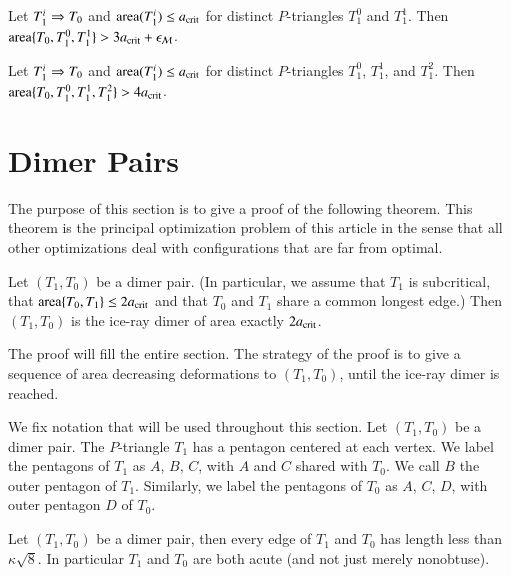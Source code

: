 \begin{lemma}
  Let $T_1^i\Rightarrow T_0$ and ${\operatorname{area}}(T_1^i)\le a_\text{crit}$  for
  distinct $P$-triangles $T_1^0$ and $T_1^1$.  Then
  ${\operatorname{area}}\{T_0,T_1^0,T_1^1\} > 3a_\text{crit} + \epsilon_{\mathcal M}$.
\end{lemma}

\begin{lemma}
  Let $T_1^i\Rightarrow T_0$ and ${\operatorname{area}}(T_1^i)\le a_\text{crit}$ for distinct
  $P$-triangles $T_1^0$, $T_1^1$, and $T_1^2$.  Then
  ${\operatorname{area}}\{T_0,T_1^0,T_1^1,T_1^2\} > 4a_\text{crit}$.
\end{lemma}


\section{Dimer Pairs}

The purpose of this section is to give a proof of the following
theorem.  This theorem is the principal optimization problem of this
article in the sense that all other optimizations deal with
configurations that are far from optimal.


\begin{theorem}
  Let $(T_1,T_0)$ be a dimer pair.  (In particular, we assume that
  $T_1$ is subcritical, that ${\operatorname{area}}\{T_0,T_1\}\le 2a_\text{crit}$ and that
  $T_0$ and $T_1$ share a common longest edge.)  Then $(T_1,T_0)$ is
  the ice-ray dimer of area exactly $2a_\text{crit}$.
\end{theorem}

The proof will fill the entire section.  The strategy of the proof is
to give a sequence of area decreasing deformations to $(T_1,T_0)$,
until the ice-ray dimer is reached.

We fix notation that will be used throughout this section. Let $(T_1,T_0)$ be
 a dimer pair.  The $P$-triangle $T_1$ has a pentagon centered at
each vertex.  We label the pentagons of $T_1$ as $A$, $B$, $C$, with
$A$ and $C$ shared with $T_0$.  We call $B$ the outer pentagon of
$T_1$.  Similarly, we label the pentagons of $T_0$ as $A$, $C$, $D$,
with outer pentagon $D$ of $T_0$.


\begin{lemma}  
  Let $(T_1,T_0)$ be a dimer pair, then every edge of $T_1$ and $T_0$
  has length less than $\kappa\sqrt8$.  In particular $T_1$ and $T_0$
  are both acute (and not just merely nonobtuse).
\end{lemma}

